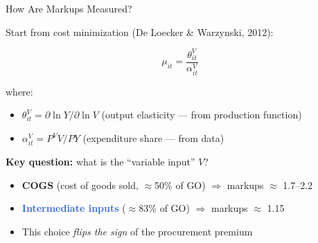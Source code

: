 \documentclass[aspectratio=169,11pt]{beamer}
\newcommand{\accenttext}[1]{\textcolor{accent}{\textbf{#1}}}
\newcommand{\highlighttext}[1]{\textcolor{highlight}{\textbf{#1}}}
\begin{document}
\begin{frame}{How Are Markups Measured?}

Start from cost minimization (De Loecker \& Warzynski, 2012):

\begin{equation*}
    \boxed{\mu_{it} = \frac{\theta^V_{it}}{\alpha^V_{it}}}
\end{equation*}

where:
\begin{itemize}
    \item $\theta^V_{it} = \partial \ln Y / \partial \ln V$ \quad (output elasticity --- from production function)
    \item $\alpha^V_{it} = P^V V / PY$ \quad (expenditure share --- from data)
\end{itemize}

\bigskip

\textbf{Key question:} what is the ``variable input'' $V$?

\medskip

\begin{itemize}
    \item \accenttext{COGS} (cost of goods sold, $\approx$50\% of GO) $\Rightarrow$ markups $\approx$ 1.7--2.2
    \item \highlighttext{Intermediate inputs} ($\approx$83\% of GO) $\Rightarrow$ markups $\approx$ 1.15
    \item This choice \emph{flips the sign} of the procurement premium
\end{itemize}

\end{frame}
\end{document}
